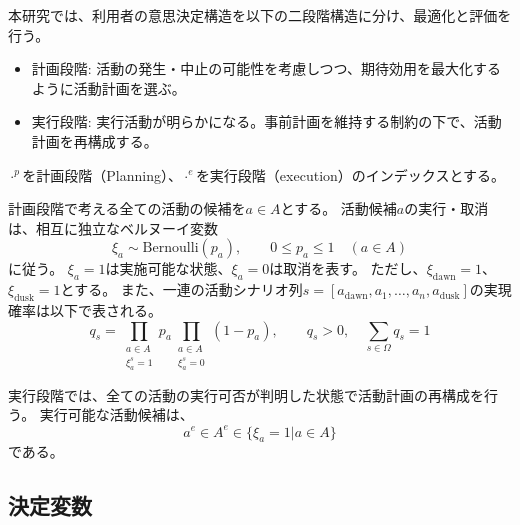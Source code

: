 本研究では、利用者の意思決定構造を以下の二段階構造に分け、最適化と評価を行う。
\begin{itemize}
 \item 計画段階: 活動の発生・中止の可能性を考慮しつつ、期待効用を最大化するように活動計画を選ぶ。
 \item 実行段階: 実行活動が明らかになる。事前計画を維持する制約の下で、活動計画を再構成する。
\end{itemize}
$\cdot^p$を計画段階（Planning）、$\cdot^e$を実行段階（execution）のインデックスとする。

計画段階で考える全ての活動の候補を$a \in A$とする。
活動候補$a$の実行・取消は、相互に独立なベルヌーイ変数
\begin{equation}
 \xi_a\sim\mathrm{Bernoulli}(p_a),\qquad 0\le p_a\le1
 \quad(a\in A)
 \label{eq:mf-bernoulli}
\end{equation}
に従う。
$\xi_a=1$は実施可能な状態、$\xi_a=0$は取消を表す。
ただし、$\xi_\mathrm{dawn}=1$、$\xi_\mathrm{dusk}=1$とする。
また、一連の活動シナリオ列$s=[a_{\mathrm{dawn}}, a_1, \dots, a_n, a_{\mathrm{dusk}}]$の実現確率は以下で表される。
\begin{equation}
 q_s=
 \prod_{\substack{a\in A\\ \xi_a^s=1}}p_a
 \prod_{\substack{a\in A\\ \xi_a^s=0}}(1-p_a),
 \qquad
 q_s>0,\quad \sum_{s\in\Omega}q_s=1
 \label{eq:mf-scenario-probability}
\end{equation}

実行段階では、全ての活動の実行可否が判明した状態で活動計画の再構成を行う。
実行可能な活動候補は、
\begin{equation}
 a^e \in A^e \in \{ \xi_a=1 | a \in A \}
 \label{eq:mf-realized-candidate-set}
\end{equation}
である。

\subsection{決定変数}
\label{subsec:decision_variable}


